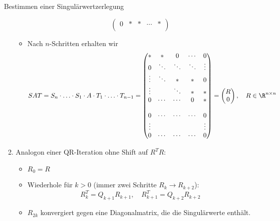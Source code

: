 \begin{defi}{Bestimmen einer Singulärwertzerlegung}
\begin{enumerate}
\begin{itemize}
\[\begin{pmatrix}
                                0      & *      & * & \cdots & *      \\
                            \end{pmatrix}
                        \]
                  \item Nach $n$-Schritten erhalten wir
                        \[
                            SAT = S_n \cdot \ldots \cdot S_1 \cdot A \cdot T_1 \cdot \ldots \cdot T_{n-1} =
                            \begin{pmatrix}
                                *      & *      & 0      & \cdots & 0      \\
                                0      & \ddots & \ddots & \ddots & \vdots \\
                                \vdots & \ddots & *      & *      & 0      \\
                                \vdots &        & \ddots & *      & *      \\
                                0      & \cdots & \cdots & 0      & *      \\
                                       &        &        &        &        \\
                                0      & \cdots & \cdots & \cdots & 0      \\
                                \vdots &        &        &        & \vdots \\
                                0      & \cdots & \cdots & \cdots & 0
                            \end{pmatrix}
                            =
                            \begin{pmatrix}
                                R \\ 0
                            \end{pmatrix}
                            , \quad R \in \R^{n \times n}
                        \]
              \end{itemize}
        \item Analogon einer QR-Iteration ohne Shift auf $R^TR$:
              \begin{itemize}
                  \item $R_0 = R$
                  \item Wiederhole für $k > 0$ (immer zwei Schritte $R_k \to R_{k+2}$):
                        \[ R_k^T = Q_{k+1} R_{k+1}, \quad R_{k+1}^T = Q_{k+2} R_{k+2} \]
                  \item $R_{2k}$ konvergiert gegen eine Diagonalmatrix, die die Singulärwerte enthält.
              \end{itemize}
    \end{enumerate}
\end{defi}

